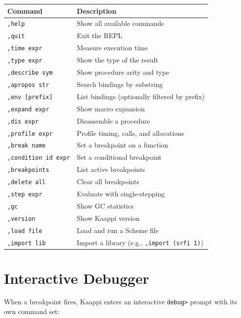 \begin{center}
\small
\begin{tabularx}{\textwidth}{@{}lY@{}}
\textbf{Command} & \textbf{Description} \\
\hline
\texttt{,help} & Show all available commands \\
\texttt{,quit} & Exit the REPL \\
\texttt{,time expr} & Measure execution time \\
\texttt{,type expr} & Show the type of the result \\
\texttt{,describe sym} & Show procedure arity and type \\
\texttt{,apropos str} & Search bindings by substring \\
\texttt{,env [prefix]} & List bindings (optionally filtered by prefix) \\
\texttt{,expand expr} & Show macro expansion \\
\texttt{,dis expr} & Disassemble a procedure \\
\texttt{,profile expr} & Profile timing, calls, and allocations \\
\texttt{,break name} & Set a breakpoint on a function \\
\texttt{,condition id expr} & Set a conditional breakpoint \\
\texttt{,breakpoints} & List active breakpoints \\
\texttt{,delete all} & Clear all breakpoints \\
\texttt{,step expr} & Evaluate with single-stepping \\
\texttt{,gc} & Show GC statistics \\
\texttt{,version} & Show Kaappi version \\
\texttt{,load file} & Load and run a Scheme file \\
\texttt{,import lib} & Import a library (e.g., \texttt{,import (srfi 1)}) \\
\end{tabularx}
\end{center}

\section{Interactive Debugger}

When a breakpoint fires, Kaappi enters an interactive \texttt{debug>} prompt with its own command set:

